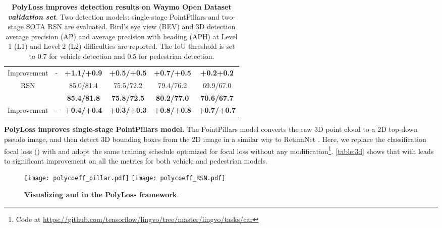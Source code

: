 \begin{table}[t]
{\begin{tabular}{cccccc}
\multicolumn{1}{c|}{Improvement} & \multicolumn{1}{c|}{-} & {\color[HTML]{3166FF} \textbf{+1.1/+0.9}} & {\color[HTML]{3166FF} \textbf{+0.5/+0.5}} & {\color[HTML]{3166FF} \textbf{+0.7/+0.5}} & {\color[HTML]{3166FF} \textbf{+0.2+0.2}} \\
\multicolumn{1}{c|}{RSN } & \multicolumn{1}{c|}{\small\par} & 85.0/81.4 & 75.5/72.2 & 79.4/76.2 & 69.9/67.0 \\
\rowcolor[HTML]{EFEFEF} 
\multicolumn{1}{c|}{\cellcolor[HTML]{EFEFEF}RSN } & \multicolumn{1}{c|}{\cellcolor[HTML]{EFEFEF} {\small  \par}} & \textbf{85.4/81.8} & \textbf{75.8/72.5} & \textbf{80.2/77.0} & \textbf{70.6/67.7} \\
\multicolumn{1}{c|}{Improvement} & \multicolumn{1}{c|}{-} & {\color[HTML]{3166FF} \textbf{+0.4/+0.4}} & {\color[HTML]{3166FF} \textbf{+0.3/+0.3}} & {\color[HTML]{3166FF} \textbf{+0.8/+0.8}} & {\color[HTML]{3166FF} \textbf{+0.7/+0.7}} \\ \bottomrule
\end{tabular}
}
 \caption{\textbf{PolyLoss improves detection results on Waymo Open Dataset \textit{validation set}}. Two detection models: single-stage PointPillars \citep{lang2019pointpillars} and two-stage SOTA RSN \citep{rsn} are evaluated. Bird's eye view (BEV) and 3D detection average precision (AP) and average precision with heading (APH) at Level 1 (L1) and Level 2 (L2) difficulties are reported. The IoU threshold is set to 0.7 for vehicle detection and 0.5 for pedestrian detection.}
 \label{table:3d}
 \vspace{-15pt}
\end{table}

\textbf{PolyLoss improves single-stage PointPillars model.} The PointPillars model converts the raw 3D point cloud to a 2D top-down pseudo image, and then detect 3D bounding boxes from the 2D image in a similar way to RetinaNet \citep{lin2017focal}. Here, we replace the classification focal loss () with  and adopt the same training schedule optimized for focal loss without any modification\footnote{Code at \url{https://github.com/tensorflow/lingvo/tree/master/lingvo/tasks/car}}. \autoref{table:3d} shows that  with   leads to significant improvement on all the metrics for both vehicle and pedestrian models. 
\begin{wrapfigure}{r}{0.42\textwidth}
  \centering
  \vspace{-10pt}
  \texttt{[image: polycoeff\_pillar.pdf]}
  \texttt{[image: polycoeff\_RSN.pdf]}
  \caption{\textbf{Visualizing  and   in the PolyLoss framework}. }
  \vspace{-10pt}
  \label{fig:poly_wod}
\end{wrapfigure}

